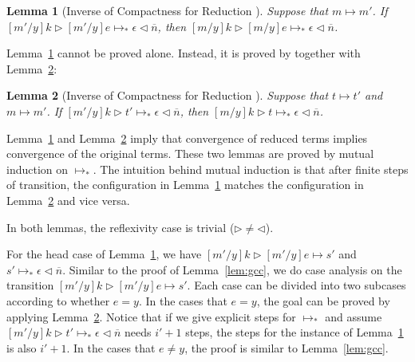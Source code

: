 \documentclass{article}
\newtheorem{lemma}{Lemma}
\newcommand{\RNum}[1]{\uppercase\expandafter{\romannumeral #1\relax}}
\begin{document}
\begin{lemma}[Inverse of Compactness for Reduction \RNum{1}]\label{lem:B}
  Suppose that $m\longmapsto m'$.
  If $[m'/y]k\triangleright[m'/y]e\longmapsto_* \epsilon\triangleleft\overline{n}$,
  then $[m/y]k\triangleright[m/y]e\longmapsto_* \epsilon\triangleleft\overline{n}$.
\end{lemma}


Lemma~\ref{lem:B} cannot be proved alone. Instead, it is proved by together with Lemma~\ref{lem:C}:


\begin{lemma}[Inverse of Compactness for Reduction \RNum{2}]\label{lem:C}
  Suppose that $t\longmapsto t'$ and $m\longmapsto m'$.
  If $[m'/y]k\triangleright t'\longmapsto_* \epsilon\triangleleft\overline{n}$,
  then $[m/y]k\triangleright t\longmapsto_* \epsilon\triangleleft\overline{n}$.
\end{lemma}

Lemma~\ref{lem:B} and Lemma~\ref{lem:C} imply that
convergence of reduced terms implies convergence of the original terms.
These two lemmas are  proved by mutual induction on $\longmapsto_*$.
The intuition behind mutual induction is that after finite steps of transition,
the configuration in Lemma~\ref{lem:B} matches the configuration in Lemma~\ref{lem:C}
and vice versa.

In both lemmas, the reflexivity case is trivial ($\triangleright\neq \triangleleft$).

For the head case of Lemma~\ref{lem:B},
we have $[m'/y]k\triangleright[m'/y]e\longmapsto s'$
and $s' \longmapsto_* \epsilon\triangleleft\overline{n}$.
Similar to the proof of Lemma~\ref{lem:gcc}, we do case analysis on
the transition $[m'/y]k\triangleright[m'/y]e\longmapsto s'$.
Each case can be divided into two subcases according to whether $e = y$.
In the cases that $e = y$, the goal can be proved by applying Lemma~\ref{lem:C}.
Notice that if we give explicit steps for $\longmapsto_*$
and assume $[m'/y]k\triangleright t'\longmapsto_* \epsilon\triangleleft\overline{n}$ needs $i' + 1$ steps,
the steps for the instance of Lemma~\ref{lem:B} is also $i' + 1$.
In the cases that $e \neq y$, the proof is similar to Lemma~\ref{lem:gcc}.
\end{document}
